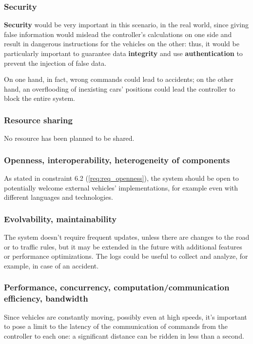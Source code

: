\subsubsection{Security}\label{req:distr_security}
\textbf{Security} would be very important in this scenario, in
the real world, since giving false information would mislead the controller's
calculations on one side and result in dangerous instructions for the vehicles
on the other: thus, it would be particularly important to guarantee data
\textbf{integrity} and use \textbf{authentication} to prevent the injection of
false data.

On one hand, in fact, wrong commands could lead to accidents; on the other hand,
an overflooding of inexisting cars' positions could lead the controller to block
the entire system.

\subsubsection{Resource sharing}\label{req:distr_sharing}
No resource has been planned to be shared.

\subsubsection{Openness, interoperability, heterogeneity of components}\label{req:distr_openness}
As stated in constraint 6.2 (\ref{req:req_openness}), the system should be open
to potentially welcome external vehicles' implementations, for example even with
different languages and technologies.

\subsubsection{Evolvability, maintainability}\label{req:distr_evolv}
The system doesn't require frequent updates, unless there are changes to the
road or to traffic rules, but it may be extended in the future with additional
features or performance optimizations. The logs could be useful to collect and
analyze, for example, in case of an accident.

\subsubsection{Performance, concurrency, computation/communication efficiency, bandwidth}\label{req:distr_performance}
Since vehicles are constantly moving, possibly even at high speeds, it's
important to pose a limit to the latency of the communication of commands from
the controller to each one: a significant distance can be ridden in less than a
second.

